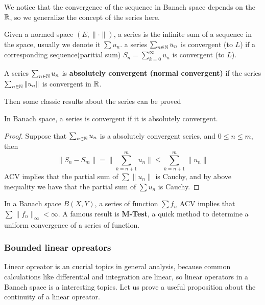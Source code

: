 \documentclass[en,hazy,blue,noraml,12pt]{elegantnote}
\begin{document}
We notice that the convergence of the sequence in Banach space depends on the \(\mathbb{R}\), so we generalize the concept of the series here.
\begin{definition}[Series] 
    Given a normed space \((E,\|\cdot\|)\), a series is the infinite sum of a sequence in the space, usually we denote it \(\sum u_n\). a series \(\sum_{n \in \mathbb{N}}u_n\) is convergent (to \(L\)) if a corresponding sequence(paritial sum) \(S_n= \sum_{k=0}^{\infty}u_n\) is convergent (to \(L\)).

    A series \(\sum_{n \in \mathbb{N}}u_n\) is \textbf{absolutely convergent (normal convergent)} if the series \(\sum_{n \in \mathbb{N}}\|u_n\|\) is convergent in \(\mathbb{R}\).
    
\end{definition}

Then some classic results about the series can be proved

\begin{proposition}
    In Banach space, a series is convergent if it is absolutely convergent.
    
    \begin{proof}
        Suppose that \(\sum_{n \in \mathbb{N}}u_n\) is a absolutely convergent series, and \(0 \leq n \leq m \), then 
        \[\|S_n-S_m\| = \|\sum_{k=n+1}^{m}u_n\| \leq \sum_{k=n+1}^{m}\|u_n\|\]
        ACV implies that the partial sum of \(\sum\|u_n\|\) is Cauchy, and by above inequality we have that the partial sum of \(\sum u_n\) is Cauchy.
    \end{proof}
\end{proposition}


\begin{proposition}
    
\end{proposition}

\begin{remark}
    In a Banach space \(B(X,Y)\), a series of function \(\sum f_n\) ACV implies that \(\sum\|f_n\|_{\infty} < \infty\). A famous result is \textbf{M-Test}, a quick method to determine a uniform convergence of a series of function.
\end{remark}

\subsubsection{Bounded linear opreators}

Linear opreator is an cucrial topics in general analysis, because common calculations like differential and integration are linear, so linear operators in a Banach space is a interesting topics. Let us prove a useful proposition about the continuity of a linear opreator.
\end{document}
